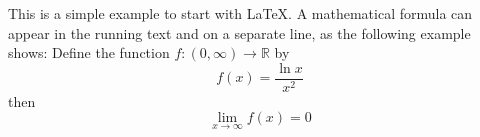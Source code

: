 \documentclass{article}
\begin{document}
This is a simple example to start with \LaTeX.
A mathematical formula can appear in the running text and
on a separate line, as the following example shows:
\bigskip
Define the function $f:(0,\infty)\to\mathbb{R}$ by
$$ f(x) = \frac{\ln x}{x^2} $$
then
$$ \lim_{x\to\infty} f(x)=0 $$
\end{document}
